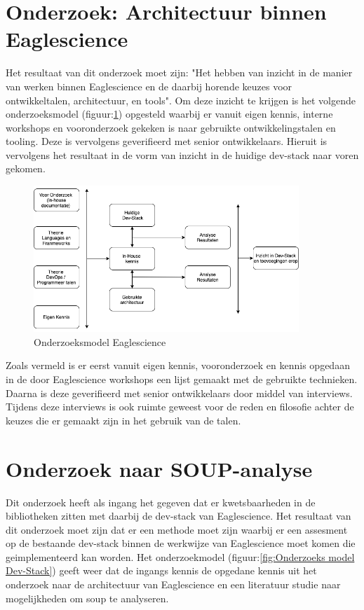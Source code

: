 \section{Onderzoek: Architectuur binnen Eaglescience}\label{sec:onderzoeksmethode-architectuur-binnen-eaglescience}
Het resultaat van dit onderzoek moet zijn: "Het hebben van inzicht in de manier van werken binnen Eaglescience en de daarbij horende keuzes voor ontwikkeltalen, architectuur, en tools".
Om deze inzicht te krijgen is het volgende onderzoeksmodel (figuur:\ref{fig:Onderzoeks model Eaglescience}) opgesteld waarbij er vanuit eigen kennis, interne workshops en vooronderzoek gekeken is naar gebruikte ontwikkelingstalen en tooling.
Deze is vervolgens geverifieerd met senior ontwikkelaars.
Hieruit is vervolgens het resultaat in de vorm van inzicht in de huidige dev-stack naar voren gekomen.
\begin{figure}[h!] %
  \myfloatalign
  \includegraphics[width=10cm]{gfx/OnderzoeksmodelES}
  \caption{Onderzoeksmodel Eaglescience}
  \label{fig:Onderzoeks model Eaglescience}
\end{figure}

Zoals vermeld is er eerst vanuit eigen kennis, vooronderzoek en kennis opgedaan in de door Eaglescience workshops een lijst gemaakt met de gebruikte technieken.
Daarna is deze geverifieerd met senior ontwikkelaars door middel van interviews.
Tijdens deze interviews is ook ruimte geweest voor de reden en filosofie achter de keuzes die er gemaakt zijn in het gebruik van de talen.

\section{Onderzoek naar SOUP-analyse}\label{sec:onderzoek-naar-soup-analyse}
Dit onderzoek heeft als ingang het gegeven dat er kwetsbaarheden in de bibliotheken zitten met daarbij de dev-stack van Eaglescience.
Het resultaat van dit onderzoek moet zijn dat er een methode moet zijn waarbij er een assesment op de bestaande dev-stack binnen de werkwijze van Eaglescience moet komen die geimplementeerd kan worden.
Het onderzoekmodel (figuur:\ref{fig:Onderzoeks model Dev-Stack}) geeft weer dat de ingangs kennis de opgedane kennis uit het onderzoek naar de architectuur van Eaglescience en een literatuur studie naar mogelijkheden om soup te analyseren.

